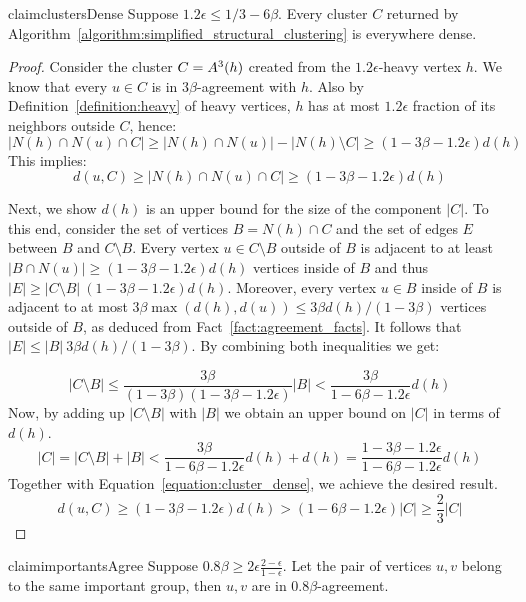 \documentclass{article}
\begin{document}
\begin{restatable}{claim}{clustersDense}
\label{claim:clusters_dense}
    Suppose $1.2\epsilon \leq 1/3-6\beta$. Every cluster $C$ returned by Algorithm~\ref{algorithm:simplified_structural_clustering} is everywhere dense.
\end{restatable}

\begin{proof}
Consider the cluster $C = A^3(h)$ created from the $1.2\epsilon$-heavy vertex $h$. We know that every $u\in C$ is in $3\beta$-agreement with $h$. Also by Definition~\ref{definition:heavy} of heavy vertices, $h$ has at most $1.2\epsilon$ fraction of its neighbors outside $C$, hence:
\[
|N(h)\cap N(u)\cap C|
\geq |N(h)\cap N(u)| - |N(h)\setminus C|
\geq (1-3\beta-1.2\epsilon) d(h)
\]
This implies:
\begin{equation}\label{equation:cluster_dense}
d(u, C)
\geq |N(h)\cap N(u)\cap C|
\geq (1-3\beta-1.2\epsilon) d(h)
\end{equation}

Next, we show $d(h)$ is an upper bound for the size of the component $|C|$.
To this end, consider the set of vertices $B = N(h)\cap C$ and the set of edges $E$ between $B$ and $C\setminus B$. Every vertex $u\in C\setminus B$ outside of $B$ is adjacent to at least $|B\cap N(u)| \geq (1-3\beta-1.2\epsilon) d(h)$ vertices inside of $B$ and thus $|E| \geq |C\setminus B|\ (1-3\beta-1.2\epsilon)d(h)$. Moreover, every vertex $u\in B$ inside of $B$ is adjacent to at most $3\beta \max(d(h), d(u)) \leq 3\beta d(h)/(1-3\beta)$ vertices outside of $B$, as deduced from Fact~\ref{fact:agreement_facts}. It follows that $|E| \leq |B|\ 3\beta d(h)/(1-3\beta)$. 
By combining both inequalities we get:

\[
|C\setminus B|
\leq \frac{3\beta}{(1-3\beta)(1-3\beta-1.2\epsilon)} |B|
< \frac{3\beta}{1-6\beta-1.2\epsilon} d(h)
\]
Now, by adding up $|C\setminus B|$ with $|B|$ we obtain an upper bound on $|C|$ in terms of $d(h)$.
\[
|C| = |C\setminus B| + |B|
< \frac{3\beta}{1-6\beta-1.2\epsilon} d(h) + d(h)
= \frac{1-3\beta-1.2\epsilon}{1-6\beta-1.2\epsilon} d(h)
\]
Together with Equation~\ref{equation:cluster_dense}, we achieve the desired result.
\[
d(u, C)
\geq (1-3\beta-1.2\epsilon) d(h)
> (1-6\beta-1.2\epsilon) |C|
\geq \frac{2}{3} |C|
\]
\end{proof}

\begin{restatable}{claim}{importantsAgree}
\label{claim:importants_agree}
    Suppose $0.8\beta \geq 2\epsilon\frac{2-\epsilon}{1-\epsilon}$. Let the pair of vertices $u, v$ belong to the same important group, then $u, v$ are in $0.8\beta$-agreement.
\end{restatable}
\end{document}
